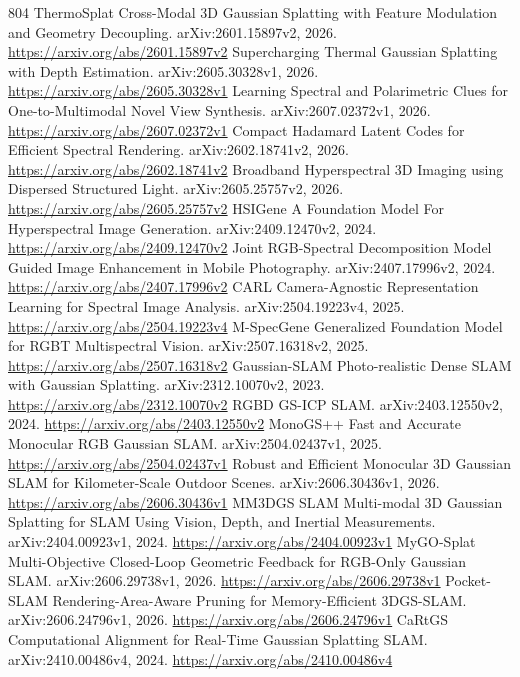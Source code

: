 \documentclass[11pt]{article}
\begin{document}
\begin{thebibliography}{804}
 ThermoSplat Cross-Modal 3D Gaussian Splatting with Feature Modulation and Geometry Decoupling. arXiv:2601.15897v2, 2026. \url{https://arxiv.org/abs/2601.15897v2}
 Supercharging Thermal Gaussian Splatting with Depth Estimation. arXiv:2605.30328v1, 2026. \url{https://arxiv.org/abs/2605.30328v1}
 Learning Spectral and Polarimetric Clues for One-to-Multimodal Novel View Synthesis. arXiv:2607.02372v1, 2026. \url{https://arxiv.org/abs/2607.02372v1}
 Compact Hadamard Latent Codes for Efficient Spectral Rendering. arXiv:2602.18741v2, 2026. \url{https://arxiv.org/abs/2602.18741v2}
 Broadband Hyperspectral 3D Imaging using Dispersed Structured Light. arXiv:2605.25757v2, 2026. \url{https://arxiv.org/abs/2605.25757v2}
 HSIGene A Foundation Model For Hyperspectral Image Generation. arXiv:2409.12470v2, 2024. \url{https://arxiv.org/abs/2409.12470v2}
 Joint RGB-Spectral Decomposition Model Guided Image Enhancement in Mobile Photography. arXiv:2407.17996v2, 2024. \url{https://arxiv.org/abs/2407.17996v2}
 CARL Camera-Agnostic Representation Learning for Spectral Image Analysis. arXiv:2504.19223v4, 2025. \url{https://arxiv.org/abs/2504.19223v4}
 M-SpecGene Generalized Foundation Model for RGBT Multispectral Vision. arXiv:2507.16318v2, 2025. \url{https://arxiv.org/abs/2507.16318v2}
 Gaussian-SLAM Photo-realistic Dense SLAM with Gaussian Splatting. arXiv:2312.10070v2, 2023. \url{https://arxiv.org/abs/2312.10070v2}
 RGBD GS-ICP SLAM. arXiv:2403.12550v2, 2024. \url{https://arxiv.org/abs/2403.12550v2}
 MonoGS++ Fast and Accurate Monocular RGB Gaussian SLAM. arXiv:2504.02437v1, 2025. \url{https://arxiv.org/abs/2504.02437v1}
 Robust and Efficient Monocular 3D Gaussian SLAM for Kilometer-Scale Outdoor Scenes. arXiv:2606.30436v1, 2026. \url{https://arxiv.org/abs/2606.30436v1}
 MM3DGS SLAM Multi-modal 3D Gaussian Splatting for SLAM Using Vision, Depth, and Inertial Measurements. arXiv:2404.00923v1, 2024. \url{https://arxiv.org/abs/2404.00923v1}
 MyGO-Splat Multi-Objective Closed-Loop Geometric Feedback for RGB-Only Gaussian SLAM. arXiv:2606.29738v1, 2026. \url{https://arxiv.org/abs/2606.29738v1}
 Pocket-SLAM Rendering-Area-Aware Pruning for Memory-Efficient 3DGS-SLAM. arXiv:2606.24796v1, 2026. \url{https://arxiv.org/abs/2606.24796v1}
 CaRtGS Computational Alignment for Real-Time Gaussian Splatting SLAM. arXiv:2410.00486v4, 2024. \url{https://arxiv.org/abs/2410.00486v4}

\end{thebibliography}
\end{document}
